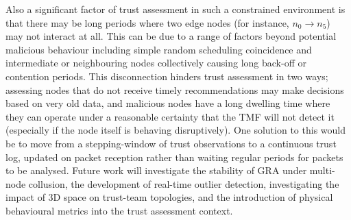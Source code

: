\documentclass[conference]{IEEEtran}
\begin{document}
Also a significant factor of trust assessment in such a constrained environment is that there may be long periods where two edge nodes (for instance, $n_0 \to n_5$) may not interact at all. 
This can be due to a range of factors beyond potential malicious behaviour including simple random scheduling coincidence and intermediate or neighbouring nodes collectively causing long back-off or contention periods.
This disconnection hinders trust assessment in two ways; assessing nodes that do not receive timely recommendations may make decisions based on very old data, and malicious nodes have a long dwelling time where they can operate under a reasonable certainty that the TMF will not detect it (especially if the node itself is behaving disruptively).
One solution to this would be to move from a stepping-window of trust observations to a continuous trust log, updated on packet reception rather than waiting regular periods for packets to be analysed.
Future work will investigate the stability of GRA under multi-node collusion, the development of real-time outlier detection, investigating the impact of 3D space on trust-team topologies, and the introduction of physical behavioural metrics into the trust assessment context.




%
%

\end{document}
